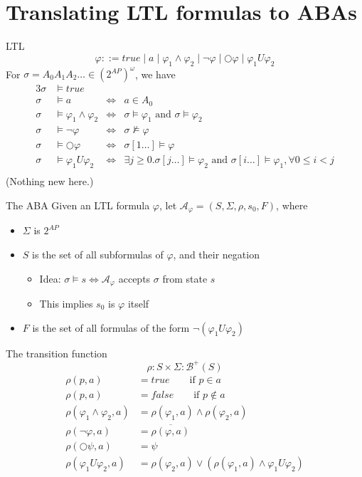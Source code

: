 \documentclass{beamer}
\begin{document}
\section{Translating LTL formulas to ABAs}
\begin{frame}{LTL}
$$ \varphi ::= 
true \mid a \mid \varphi_1 \wedge \varphi_2 \mid \neg \varphi \mid \Circle \varphi \mid \varphi_1 U \varphi_2
$$
For $\sigma = A_0A_1A_2\dots \in (2^{AP})^\omega$, we have
\begin{alignat*}{3}
\sigma &\models true & \\
\sigma &\models a &\iff& a \in A_0 \\
\sigma &\models \varphi_1 \wedge \varphi_2 &\iff& \sigma \models \varphi_1 \text{ and } \sigma \models \varphi_2 \\
\sigma &\models \neg \varphi &\iff& \sigma \not \models \varphi \\
\sigma &\models \Circle \varphi &\iff& \sigma[1\dots] \models \varphi \\
\sigma &\models \varphi_1 U \varphi_2 &\iff& \exists j \geq 0. \sigma[j\dots] \models \varphi_2 \text{ and } \sigma[i\dots] \models \varphi_1, \forall 0 \leq i < j \\
\end{alignat*}
(Nothing new here.)
\end{frame}

\begin{frame}{The ABA}
Given an LTL formula $\varphi$, let $\mathcal{A}_\varphi = (S, \Sigma, \rho, s_0, F)$, where
\begin{itemize}
\item $\Sigma$ is $2^{AP}$
\item $S$ is the set of all subformulas of $\varphi$, and their negation
    \begin{itemize}
    \item Idea: $\sigma \models s \iff \mathcal{A}_\varphi$ accepts $\sigma$ from state $s$
    \item This implies $s_0$ is $\varphi$ itself
    \end{itemize}
\item $F$ is the set of all formulas of the form $\neg (\varphi_1 U \varphi_2)$
\end{itemize}
\end{frame}

\begin{frame}{The transition function}
$$\rho: S \times \Sigma: \mathcal{B}^+(S)$$
\begin{align*}
\rho(p, a) &= true \qquad \text{if }  p \in a \\
\rho(p, a) &= false \qquad \text{if } p \not \in a \\
\rho(\varphi_1 \wedge \varphi_2, a) &= \rho(\varphi_1, a) \wedge \rho(\varphi_2, a) \\
\rho(\neg \varphi, a) &= \overline{\rho(\varphi, a)} \\
\rho(\Circle \psi, a) &= \psi \\
\rho(\varphi_1 U \varphi_2, a) &= \rho(\varphi_2, a) \vee (\rho(\varphi_1, a) \wedge \varphi_1 U \varphi_2)
\end{align*}
\end{frame}
\end{document}
